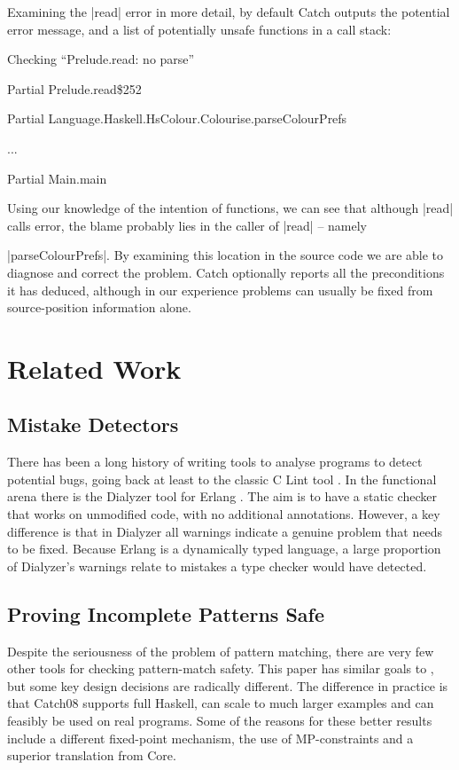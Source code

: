 \documentclass[preprint]{sigplanconf}
\begin{document}
Examining the |read| error in more detail, by default Catch outputs the potential error message, and a list of potentially unsafe functions in a call stack:

\smallskip
\par\noindent\textsf{Checking ``Prelude.read: no parse''}
\par\noindent\textsf{Partial Prelude.read\$252}
\par\noindent\textsf{Partial Language.Haskell.HsColour.Colourise.parseColourPrefs}
\par\noindent\textsf{...}
\par\noindent\textsf{Partial Main.main}
\smallskip

Using our knowledge of the intention of functions, we can see that although |read| calls error, the blame probably lies in the caller of |read| -- namely \ignore|parseColourPrefs|. By examining this location in the source code we are able to diagnose and correct the problem. Catch optionally reports all the preconditions it has deduced, although in our experience problems can usually be fixed from source-position information alone.

\section{Related Work}
\label{sec:related}

\subsection{Mistake Detectors}

There has been a long history of writing tools to analyse programs to detect potential bugs, going back at least to the classic C Lint tool \cite{lint}. In the functional arena there is the Dialyzer tool \cite{dialyzer} for Erlang \cite{erlang}. The aim is to have a static checker that works on unmodified code, with no additional annotations. However, a key difference is that in Dialyzer all warnings indicate a genuine problem that needs to be fixed. Because Erlang is a dynamically typed language, a large proportion of Dialyzer's warnings relate to mistakes a type checker would have detected.

\subsection{Proving Incomplete Patterns Safe}

Despite the seriousness of the problem of pattern matching, there are very few other tools for checking pattern-match safety. This paper has similar goals to \citet{me:catch_tfp}, but some key design decisions are radically different. The difference in practice is that Catch08 supports full Haskell, can scale to much larger examples and can feasibly be used on real programs. Some of the reasons for these better results include a different fixed-point mechanism, the use of MP-constraints and a superior translation from Core.
\end{document}
